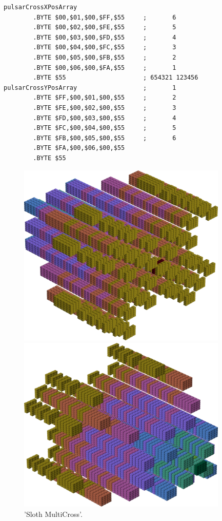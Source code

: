 \begin{lstlisting}
pulsarCrossXPosArray
        .BYTE $00,$01,$00,$FF,$55     ;       6      
        .BYTE $00,$02,$00,$FE,$55     ;       5      
        .BYTE $00,$03,$00,$FD,$55     ;       4      
        .BYTE $00,$04,$00,$FC,$55     ;       3      
        .BYTE $00,$05,$00,$FB,$55     ;       2      
        .BYTE $00,$06,$00,$FA,$55     ;       1      
        .BYTE $55                     ; 654321 123456
pulsarCrossYPosArray                  ;       1      
        .BYTE $FF,$00,$01,$00,$55     ;       2      
        .BYTE $FE,$00,$02,$00,$55     ;       3      
        .BYTE $FD,$00,$03,$00,$55     ;       4      
        .BYTE $FC,$00,$04,$00,$55     ;       5      
        .BYTE $FB,$00,$05,$00,$55     ;       6      
        .BYTE $FA,$00,$06,$00,$55
        .BYTE $55
\end{lstlisting}


\begin{figure}[H]
    \centering
    \begin{adjustbox}{width=10cm,center}
      \includegraphics[width=10cm]{src/colorspace_patterns/pattern5-45.png}%
    \end{adjustbox}
    \begin{adjustbox}{width=10cm}
      \includegraphics[width=10cm]{src/colorspace_patterns/pattern5-225.png}%
    \end{adjustbox}
\caption{'Sloth MultiCross'.}
\end{figure}
\clearpage

